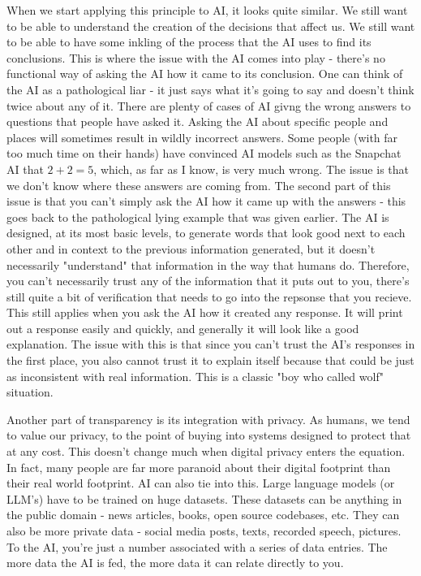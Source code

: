 \documentclass[12pt]{article}
\begin{document}
    When we start applying this principle to AI, it looks quite similar. We still want to be able
    to understand the creation of the decisions that affect us. We still want to be able to have
    some inkling of the process that the AI uses to find its conclusions. This is where the issue
    with the AI comes into play - there's no functional way of asking the AI how it came to its
    conclusion. One can think of the AI as a pathological liar - it just says what it's going to
    say and doesn't think twice about any of it. There are plenty of cases of AI givng the wrong
    answers to questions that people have asked it. Asking the AI about specific people and places
    will sometimes result in wildly incorrect answers. Some people (with far too much time on their
    hands) have convinced AI models such as the Snapchat AI that $2+2=5$, which, as far as I know,
    is very much wrong. The issue is that we don't know where these answers are coming from. The
    second part of this issue is that you can't simply ask the AI how it came up with the answers - 
    this goes back to the pathological lying example that was given earlier. The AI is designed,
    at its most basic levels, to generate words that look good next to each other and in context
    to the previous information generated, but it doesn't necessarily "understand" that information
    in the way that humans do. Therefore, you can't necessarily trust any of the information that
    it puts out to you, there's still quite a bit of verification that needs to go into the repsonse
    that you recieve. This still applies when you ask the AI how it created any response. It will
    print out a response easily and quickly, and generally it will look like a good explanation.
    The issue with this is that since you can't trust the AI's responses in the first place,
    you also cannot trust it to explain itself because that could be just as inconsistent with 
    real information. This is a classic "boy who called wolf" situation.

    Another part of transparency is its integration with privacy. As humans, we tend to value our
    privacy, to the point of buying into systems designed to protect that at any cost. This doesn't
    change much when digital privacy enters the equation. In fact, many people are far more
    paranoid about their digital footprint than their real world footprint. AI can also tie into
    this. Large language models (or LLM's) have to be trained on huge datasets. These datasets can
    be anything in the public domain - news articles, books, open source codebases, etc. They can
    also be more private data - social media posts, texts, recorded speech, pictures. To the AI,
    you're just a number associated with a series of data entries. The more data the AI is fed,
    the more data it can relate directly to you.
\end{document}
